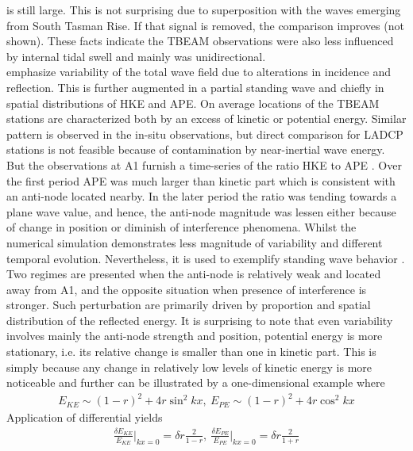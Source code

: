 \documentclass[12pt]{article}
\begin{document}
is still large. This is not surprising due to superposition with the waves emerging from South 
Tasman Rise. If that signal is removed, the comparison improves (not shown). These facts indicate 
the TBEAM observations were also less influenced by internal tidal swell and mainly was unidirectional. \\
 emphasize variability of the total wave field due to 
alterations in incidence and reflection. This is further augmented in a partial standing wave and 
chiefly in spatial distributions of HKE and APE. On average  locations of the TBEAM stations are characterized both by an excess of kinetic 
or potential energy. Similar pattern is observed in the in-situ observations, but direct 
comparison for LADCP stations is not feasible because of contamination by near-inertial wave 
energy. But the observations at A1 furnish a time-series of the ratio HKE to APE 
. Over the first period APE was much larger 
than kinetic part which is consistent with an anti-node located nearby. In the later period the 
ratio was tending towards a plane wave value, and hence, the anti-node magnitude was lessen either 
because of change in position or diminish of interference phenomena. Whilst the numerical 
simulation 
demonstrates less magnitude of variability and different temporal evolution. Nevertheless, it is 
used to exemplify standing wave behavior . Two regimes are 
presented when the 
anti-node is relatively weak and located away from A1, and the opposite situation when presence of 
interference is stronger. Such perturbation are primarily driven by proportion and spatial 
distribution of the reflected energy. It is surprising to note that even variability involves 
mainly the anti-node strength and position, potential energy is more stationary, i.e. its relative 
change is smaller than one in kinetic part. This is simply because any change in relatively low 
levels of kinetic energy is more noticeable and further can be illustrated by a one-dimensional 
example \citep{martini2007diagnosing} where 
\begin{align}
E_{KE} \sim (1 - r)^2 + 4r \sin^2{k x},~E_{PE} \sim (1 - r)^2 + 4r \cos^2{k x}
\end{align}
Application of differential yields
\begin{align}
\frac{\delta E_{KE}}{E_{KE}}\big|_{kx = 0} = \delta r \frac{2}{1 - r},~\frac{\delta 
	E_{PE}}{E_{PE}}\big|_{kx = 0} = \delta r \frac{2}{1 + r}
\end{align}
\end{document}
